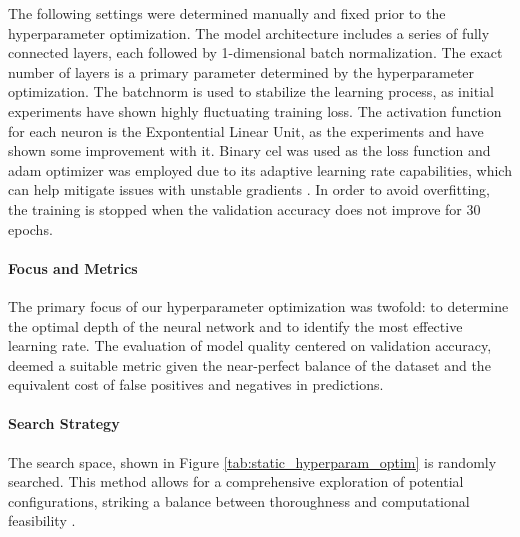 \documentclass[12pt, a4paper, headinclude, twoside, plainheadsepline, open=right, numbers=noenddot, hidelinks, toc=listof, toc=bibliography]{scrreprt}
\begin{document}
The following settings were determined manually and fixed prior to the hyperparameter optimization.
The model architecture includes a series of fully connected layers, each followed by 1-dimensional batch normalization.
The exact number of layers is a primary parameter determined by the hyperparameter optimization.
The batchnorm is used to stabilize the learning process, as initial experiments have shown highly fluctuating training loss.
The activation function for each neuron is the Expontential Linear Unit, as the experiments and \citeauthor{doUsingMachineLearning2021} \cite{doUsingMachineLearning2021} have shown some improvement with it.
Binary \acl{cel} was used as the loss function and adam optimizer was employed due to its adaptive learning rate capabilities, which can help mitigate issues with unstable gradients \cite{kingmaAdamMethodStochastic2017}.
In order to avoid overfitting, the training is stopped when the validation accuracy does not improve for 30 epochs.

\paragraph{Focus and Metrics}
The primary focus of our hyperparameter optimization was twofold: to determine the optimal depth of the neural network and to identify the most effective learning rate. The evaluation of model quality centered on validation accuracy, deemed a suitable metric given the near-perfect balance of the dataset and the equivalent cost of false positives and negatives in predictions.

\paragraph{Search Strategy}

The search space, shown in Figure \ref{tab:static_hyperparam_optim} is randomly searched.
This method allows for a comprehensive exploration of potential configurations, striking a balance between thoroughness and computational feasibility \cite{bergstraRandomSearchHyperParameter}.
\end{document}
